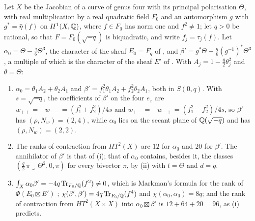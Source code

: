 \begin{proposition}
\label{prop:markmanquarticclasses}
Let $X$ be the Jacobian of a curve of genus four with its principal
polarisation $\Theta$, with real multiplication by a real quadratic field
$F_{0}$ and an automorphism $g$ with $g^{*}=\hat\eta(f)$ on $H^{1}(X,\mathbb{Q})$,
where $f\in F_{0}$ has norm one and $f^{2}\ne1$; let $q>0$ be rational, so
that $F=F_{0}(\sqrt{-q})$ is biquadratic, and write $f_{j}=\tau_{j}(f)$. Let
$\alpha_{0}=\Theta-\frac q6\Theta^{3}$, the character of the sheaf $E_{0}=F_{q}$
of \cite[Example~8.2.4]{Mar25a}, and
$\beta'=g^{*}\Theta-\frac q6(g^{-1})^{*}\Theta^{3}$, a multiple of which is the
character of the sheaf $E'$ of \cite[Example~11.2.7]{Mar25c}. With
$A_{j}=1-\frac q2\theta_{j}^{2}$ and $\theta=\Theta$:
\begin{enumerate}[label=\textup{(\roman*)},leftmargin=2.6em,itemsep=2pt]
\item $\alpha_{0}=\theta_{1}A_{2}+\theta_{2}A_{1}$ and
  $\beta'=f_{1}^{2}\theta_{1}A_{2}+f_{2}^{2}\theta_{2}A_{1}$, both in $S(0,q)$.
  With $s=\sqrt{-q}$, the coefficients of $\beta'$ on the four
  $e_{\varepsilon}$ are $w_{++}=-w_{--}=(f_{1}^{2}+f_{2}^{2})/4s$ and
  $w_{+-}=-w_{-+}=(f_{1}^{2}-f_{2}^{2})/4s$, so $\beta'$ has
  $(\rho,N_{w})=(2,4)$, while $\alpha_{0}$ lies on the secant plane of
  $\mathbb{Q}(\sqrt{-q})$ and has $(\rho,N_{w})=(2,2)$.
\item The ranks of contraction from $HT^{2}(X)$ are $12$ for $\alpha_{0}$ and
  $20$ for $\beta'$. The annihilator of $\beta'$ is that of
  (i); that of $\alpha_{0}$ contains, besides it, the
  classes $(\frac q2\,\pi\lrcorner\,\Theta^{2},0,\pi)$ for every bivector
  $\pi$, by (ii) with $t=\Theta$ and $d=q$.
\item $\int_{X}\alpha_{0}\beta'=-4q\operatorname{Tr}_{F_{0}/\mathbb{Q}}(f^{2})\ne0$, which is
  Markman's formula for the rank of $\Phi(E_{0}\boxtimes E')$
  \cite[Lemma~11.2.8]{Mar25c}; $\chi(\beta',\beta')=4q\operatorname{Tr}_{F_{0}/\mathbb{Q}}(f^{4})$ and
  $\chi(\alpha_{0},\alpha_{0})=8q$; and the rank of contraction from
  $HT^{2}(X\times X)$ into $\alpha_{0}\boxtimes\beta'$ is $12+64+20=96$, as
  (i) predicts.
\end{enumerate}
\end{proposition}

